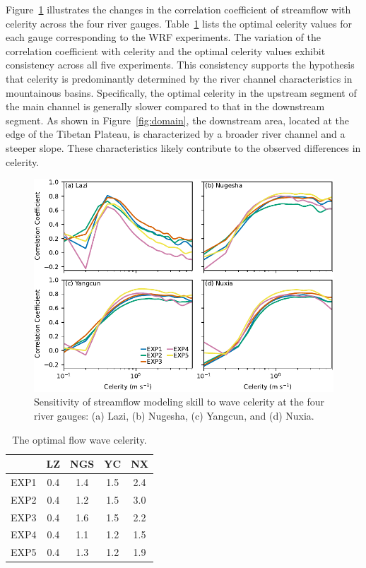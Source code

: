 \documentclass[draft]{agujournal2019}
\begin{document}
Figure~\ref{fig:celerity} illustrates the changes in the correlation coefficient of streamflow with celerity across the four river gauges. Table~\ref{tab:celerity} lists the optimal celerity values for each gauge corresponding to the WRF experiments. The variation of the correlation coefficient with celerity and the optimal celerity values exhibit consistency across all five experiments. This consistency supports the hypothesis that celerity is predominantly determined by the river channel characteristics in mountainous basins. Specifically, the optimal celerity in the upstream segment of the main channel is generally slower compared to that in the downstream segment. As shown in Figure~\ref{fig:domain}, the downstream area, located at the edge of the Tibetan Plateau, is characterized by a broader river channel and a steeper slope. These characteristics likely contribute to the observed differences in celerity.

\begin{figure}[h!]
  \centering
  \noindent\includegraphics[width=140mm]{q_sens_cc.pdf}
  \caption{Sensitivity of streamflow modeling skill to wave celerity at the four river gauges: (a) Lazi, (b) Nugesha, (c) Yangcun, and (d) Nuxia.}\label{fig:celerity}
\end{figure}

\begin{table}[h!]
  \centering
  \doublerulesep 0.3pt
  \renewcommand{\arraystretch}{1}  %
  \caption{The optimal flow wave celerity.}
  \label{tab:celerity}
  \vspace*{5mm}
  \small
  \begin{tabular*}{50mm}{ccccc}
    \hline
    & LZ & NGS & YC & NX \\
    \hline
    EXP1 & 0.4 & 1.4 & 1.5 & 2.4 \\
    EXP2 & 0.4 & 1.2 & 1.5 & 3.0 \\
    EXP3 & 0.4 & 1.6 & 1.5 & 2.2 \\
    EXP4 & 0.4 & 1.1 & 1.2 & 1.5 \\
    EXP5 & 0.4 & 1.3 & 1.2 & 1.9 \\
    \hline
  \end{tabular*}
  \renewcommand{\arraystretch}{1}  %
\end{table}
\end{document}
